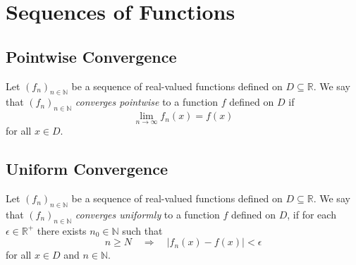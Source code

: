 \chapter{Sequences of Functions}
\section{Pointwise Convergence}
\begin{definition}
  Let $(f_n)_{n \in \mathbb{N}}$ be a sequence of real-valued functions defined
  on $D \subseteq \mathbb{R}$.
  We say that $(f_n)_{n \in \mathbb{N}}$ \emph{converges pointwise} to a
  function $f$ defined on $D$ if
  \begin{equation*}
    \lim_{n \to \infty} f_n(x) = f(x)
  \end{equation*}
  for all $x \in D$.
\end{definition}

\section{Uniform Convergence}
\begin{definition}
  Let $(f_n)_{n \in \mathbb{N}}$ be a sequence of real-valued functions defined
  on $D \subseteq \mathbb{R}$.
  We say that $(f_n)_{n \in \mathbb{N}}$ \emph{converges uniformly} to a
  function $f$ defined on $D$, if for each $\epsilon \in \mathbb{R}^+$ there
  exists $n_0 \in \mathbb{N}$ such that
  \begin{equation*}
    n \geq N
    \quad \Rightarrow \quad
    |f_n(x) - f(x)| < \epsilon
  \end{equation*}
  for all $x \in D$ and $n \in \mathbb{N}$.
\end{definition}